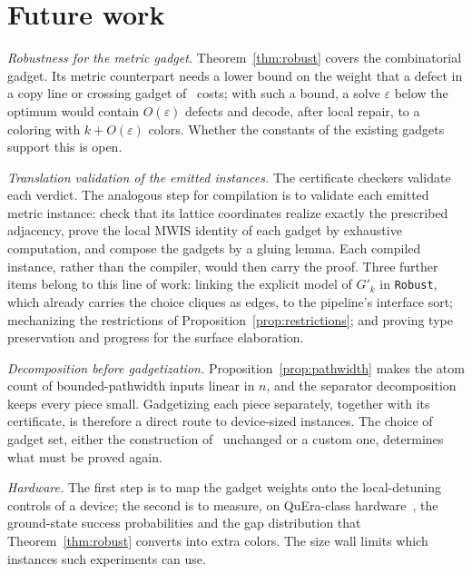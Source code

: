\documentclass[a4paper,fleqn]{cas-sc}
\begin{document}
\section{Future work}
\label{sec:future}

\emph{Robustness for the metric gadget.} Theorem~\ref{thm:robust} covers the
combinatorial gadget. Its metric counterpart needs a lower bound on the weight that a
defect in a copy line or crossing gadget of~\cite{Nguyen2023} costs; with such a
bound, a solve $\varepsilon$ below the optimum would contain $O(\varepsilon)$ defects
and decode, after local repair, to a coloring with $k+O(\varepsilon)$ colors. Whether
the constants of the existing gadgets support this is open.

\emph{Translation validation of the emitted instances.} The certificate checkers
validate each verdict. The analogous step for compilation is to validate each emitted
metric instance: check that its lattice coordinates realize exactly the prescribed
adjacency, prove the local MWIS identity of each gadget by exhaustive computation, and
compose the gadgets by a gluing lemma. Each compiled instance, rather than the
compiler, would then carry the proof. Three further items belong to this line of
work: linking the explicit model of $G'_k$ in \texttt{Robust}, which already carries
the choice cliques as edges, to the pipeline's interface sort; mechanizing the
restrictions of Proposition~\ref{prop:restrictions}; and proving type preservation and
progress for
the surface elaboration.

\emph{Decomposition before gadgetization.} Proposition~\ref{prop:pathwidth} makes the
atom count of bounded-pathwidth inputs linear in $n$, and the separator decomposition
keeps every piece small. Gadgetizing each piece separately, together with its
certificate, is therefore a direct route to device-sized instances. The choice of
gadget set, either the construction of~\cite{Nguyen2023} unchanged or a custom one,
determines what must be proved again.

\emph{Hardware.} The first step is to map the gadget weights onto the local-detuning
controls of a device; the second is to measure, on QuEra-class
hardware~\cite{Wurtz2023}, the ground-state success probabilities and the gap
distribution that Theorem~\ref{thm:robust} converts into extra colors. The size wall
limits which instances such experiments can use.
\end{document}
